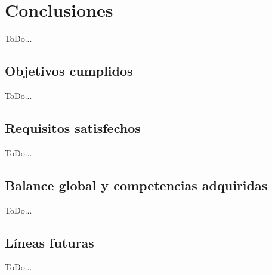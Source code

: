 \chapter{Conclusiones}
\label{cap:capitulo5}

ToDo...

\section{Objetivos cumplidos}
\label{sec:objetivos_cumplidos}

ToDo...

\section{Requisitos satisfechos}
\label{sec:requisitos_satisfechos}

ToDo...

\section{Balance global y competencias adquiridas}
\label{sec:balance_global_competencias_adquiridas}

ToDo...

\section{Líneas futuras}
\label{sec:lineas_futuras}

ToDo...